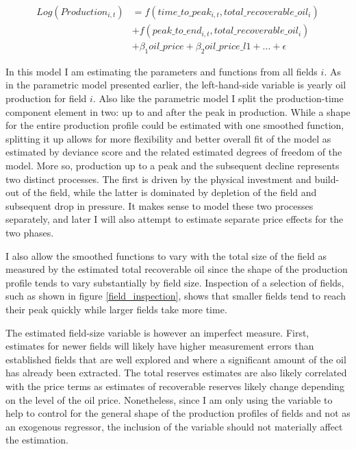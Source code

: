 \documentclass[11pt]{article}
\begin{document}
\begin{equation}
\begin{split}

	Log(Production_{i,t}) & = f(time\_to\_peak_{i,t}, total\_recoverable\_oil_i) \\
 	 \quad & + f(peak\_to\_end_{i,t}, total\_recoverable\_oil_i) \\
	 \quad & + \beta_1 oil\_price + \beta_2 oil\_price\_l1 + ... +  \epsilon
\label{gam_price_eqn}
\end{split}
\end{equation}

In this model I am estimating the parameters and functions from all fields $i$. As in the parametric model presented earlier, the left-hand-side variable is yearly oil production for field $i$. Also like the parametric model I split the production-time component element in two: up to and after the peak in production. 
While a shape for the entire production profile could be estimated with one smoothed function, splitting it up allows for more flexibility and better overall fit of the model as estimated by deviance score and the related estimated degrees of freedom of the model.  More so, production up to a peak and the subsequent decline represents two distinct processes.  The first is driven by the physical investment and build-out of the field, while the latter is dominated by depletion of the field and subsequent drop in pressure. It makes sense to model these two processes separately, and later I will also attempt to estimate separate price effects for the two phases. 

I also allow the smoothed functions to vary with the total size of the field as measured by the estimated total recoverable oil since the shape of the production profile tends to vary substantially by field size.  Inspection of a selection of fields, such as shown in figure \ref{field_inspection}, shows that smaller fields tend to reach their peak quickly while larger fields take more time. 

The estimated field-size variable is however an imperfect measure.  First, estimates for newer fields will likely have higher measurement errors than established fields that are well explored and where a significant amount of the oil has already been extracted.  The total reserves estimates are also likely correlated with the price terms as estimates of recoverable reserves likely change depending on the level of the oil price.  Nonetheless, since I am only using the variable to help to control for the general shape of the production profiles of fields and not as an exogenous regressor, the inclusion of the variable should not materially affect the estimation.
\end{document}
